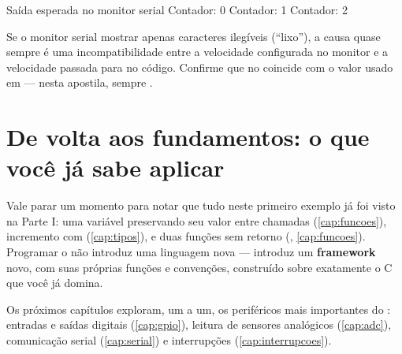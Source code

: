 \begin{codigobash}{Saída esperada no monitor serial}
Contador: 0
Contador: 1
Contador: 2
\end{codigobash}

\begin{dica}
Se o monitor serial mostrar apenas caracteres ilegíveis (``lixo''), a causa quase sempre é uma incompatibilidade entre a velocidade configurada no monitor e a velocidade passada para  no código. Confirme que  no  coincide com o valor usado em  — nesta apostila, sempre .
\end{dica}

\section{De volta aos fundamentos: o que você já sabe aplicar}

Vale parar um momento para notar que tudo neste primeiro exemplo já foi visto na Parte I: uma variável  preservando seu valor entre chamadas (\cref{cap:funcoes}), incremento com \code{++} (\cref{cap:tipos}), e duas funções sem retorno (, \cref{cap:funcoes}). Programar o \ESP{} não introduz uma linguagem nova — introduz um \textbf{framework} novo, com suas próprias funções e convenções, construído sobre exatamente o C que você já domina.

Os próximos capítulos exploram, um a um, os periféricos mais importantes do \ESP{}: entradas e saídas digitais (\cref{cap:gpio}), leitura de sensores analógicos (\cref{cap:adc}), comunicação serial (\cref{cap:serial}) e interrupções (\cref{cap:interrupcoes}).
